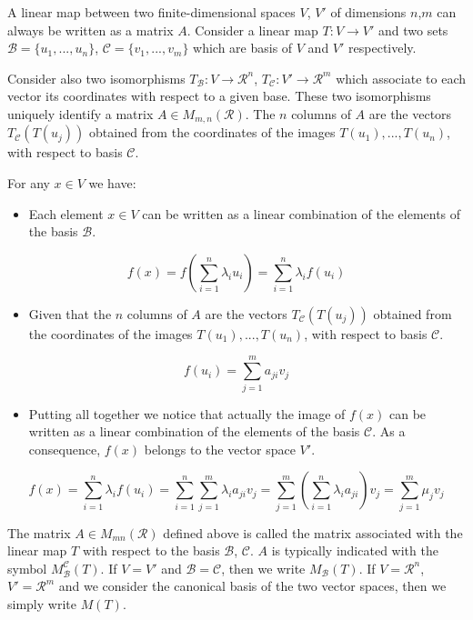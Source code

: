 A linear map between two finite-dimensional spaces $V$, $V'$ of dimensions $n$,$m$ can always be written as a matrix $A$. Consider a linear map $T: V \rightarrow V'$ and two sets $\mathcal{B}=\{u_1,...,u_n\}$, $\mathcal{C}=\{v_1,...,v_m\}$ which are basis of $V$ and $V'$ respectively.

Consider also two isomorphisms $T_{\mathcal{B}}: V \rightarrow {\mathcal{R}}^{n}$, $T_{\mathcal{C}}: V' \rightarrow {\mathcal{R}}^{m}$ which associate to each vector its coordinates with respect to a given base. These two isomorphisms uniquely identify a matrix $A \in M_{m,n}(\mathcal{R})$. The $n$ columns of $A$ are the vectors $T_{\mathcal{C}}(T(u_j))$ obtained from the coordinates of the images $T(u_1),...,T(u_n)$, with respect to basis $\mathcal{C}$.

For any $x \in V$ we have:
\begin{itemize}
    \item Each element $x \in V$ can be written as a linear combination of the elements of the basis $\mathcal{B}$.
\end{itemize}
\begin{equation*}
    f(x) = f(\sum_{i=1}^n \lambda_i u_i) = \sum_{i=1}^n \lambda_i f(u_i)
\end{equation*}
\begin{itemize}
    \item Given that the $n$ columns of $A$ are the vectors $T_{\mathcal{C}}(T(u_j))$ obtained from the coordinates of the images $T(u_1),...,T(u_n)$, with respect to basis $\mathcal{C}$.
\end{itemize}
\begin{equation*}
    f(u_i) = \sum_{j=1}^m a_{ji}v_j
\end{equation*}
\begin{itemize}
    \item Putting all together we notice that actually the image of $f(x)$ can be written as a linear combination of the elements of the basis $\mathcal{C}$. As a consequence, $f(x)$ belongs to the vector space $V'$.
\end{itemize}
\begin{equation*}
    f(x) = \sum_{i=1}^n \lambda_i f(u_i) = \sum_{i=1}^n \sum_{j=1}^m \lambda_i a_{ji} v_j = \sum_{j=1}^m (\sum_{i=1}^n \lambda_i a_{ji}) v_j = \sum_{j=1}^m \mu_j v_j
\end{equation*}

The matrix $A \in M_{mn}(\mathcal{R})$ defined above is called the matrix associated with the linear map $T$ with respect to the basis $\mathcal{B}$, $\mathcal{C}$. $A$ is typically indicated with the symbol $M^\mathcal{C}_\mathcal{B}(T)$. If $V=V'$ and $\mathcal{B}=\mathcal{C}$, then we write $M_\mathcal{B}(T)$. If $V=\mathcal{R}^n$, $V'=\mathcal{R}^m$ and we consider the canonical basis of the two vector spaces, then we simply write $M(T)$.


